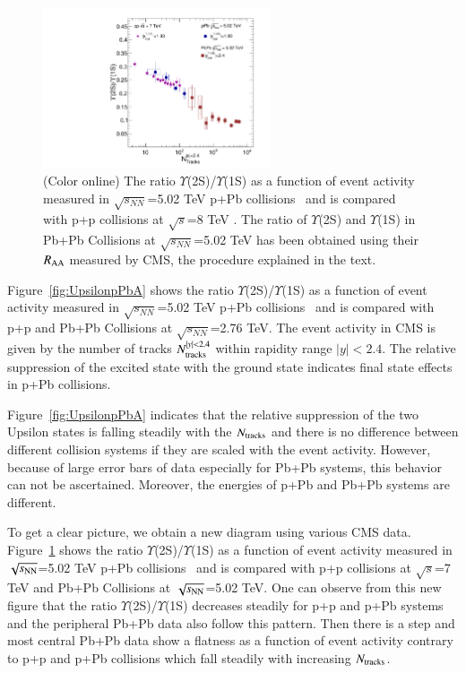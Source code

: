 \begin{figure}
  \begin{center}
    \includegraphics[width=0.60\textwidth]{Figures/Fig15_LHC_Y2SByY1S_NTrk.pdf}
\caption{(Color online)
 The ratio $\Upsilon$(2S)/$\Upsilon$(1S) as a function of event activity measured in 
$\sqrt{s_{NN}}$=5.02 TeV p+Pb collisions~\cite{CMS:2013jsu} and is compared with p+p
collisions at $\sqrt{s}$=8 TeV \cite{CMS:2020fae}.
The ratio of $\Upsilon$(2S) and $\Upsilon$(1S) in Pb+Pb Collisions at
$\sqrt{s_{NN}}$=5.02 TeV has been obtained using their $R_{\rm AA}$ measured by CMS, 
the procedure explained in the text.
}
\label{fig:UpsilonpPb}
\end{center}
\end{figure}



Figure~\ref{fig:UpsilonpPbA} shows
the ratio $\Upsilon$(2S)/$\Upsilon$(1S) as a function of event activity measured in 
$\sqrt{s_{NN}}$=5.02 TeV p+Pb collisions~\cite{CMS:2013jsu} and is compared with p+p
and Pb+Pb Collisions at $\sqrt{s_{NN}}$=2.76 TeV.
The event activity in CMS is given by the number of tracks $N_{\rm tracks}^{|y|<2.4}$ within rapidity
range $|y|<2.4$. The relative suppression of the excited state with the ground state indicates final
state effects in p+Pb collisions. 

Figure~\ref{fig:UpsilonpPbA} indicates that the relative suppression of
the two Upsilon states is falling steadily with the $N_{\rm tracks}$ and
there is no difference between different collision systems if
they are scaled with the event activity. However, because of large error bars
of data especially for Pb+Pb systems, this behavior can not be ascertained.
Moreover, the energies of p+Pb and Pb+Pb systems are different.

To get a clear picture, we obtain a new diagram using various CMS data.
Figure~\ref{fig:UpsilonpPb} shows the ratio $\Upsilon$(2S)/$\Upsilon$(1S) as a function of
event activity measured in $\sqrt{s_{\rm NN}}$=5.02 TeV p+Pb collisions~\cite{CMS:2013jsu}
and is compared with p+p collisions at $\sqrt{s}$=7 TeV \cite{CMS:2020fae} and
Pb+Pb Collisions at $\sqrt{s_{\rm NN}}$=5.02 TeV. One can observe from this new figure
that the ratio $\Upsilon$(2S)/$\Upsilon$(1S) decreases steadily for p+p and p+Pb systems
and the peripheral Pb+Pb data also follow this pattern. Then there is a step and most central Pb+Pb
data show a flatness as a function of event activity contrary to p+p and
p+Pb collisions which fall steadily with increasing $N_{\rm tracks}$.


